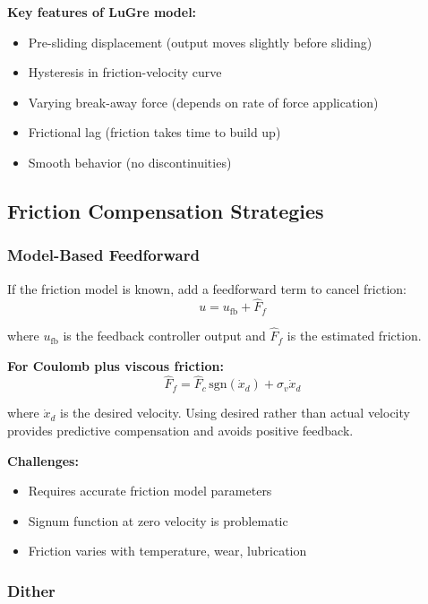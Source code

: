 \textbf{Key features of LuGre model:}
\begin{itemize}
    \item Pre-sliding displacement (output moves slightly before sliding)
    \item Hysteresis in friction-velocity curve
    \item Varying break-away force (depends on rate of force application)
    \item Frictional lag (friction takes time to build up)
    \item Smooth behavior (no discontinuities)
\end{itemize}

\subsection{Friction Compensation Strategies}

\subsubsection{Model-Based Feedforward}

If the friction model is known, add a feedforward term to cancel friction:
\begin{equation}
u = u_{\text{fb}} + \hat{F}_f
\label{eq:friction_feedforward}
\end{equation}

where $u_{\text{fb}}$ is the feedback controller output and $\hat{F}_f$ is the estimated friction.

\textbf{For Coulomb plus viscous friction:}
\begin{equation}
\hat{F}_f = \hat{F}_c \, \text{sgn}(\dot{x}_d) + \hat{\sigma}_v \dot{x}_d
\end{equation}

where $\dot{x}_d$ is the desired velocity. Using desired rather than actual velocity provides predictive compensation and avoids positive feedback.

\textbf{Challenges:}
\begin{itemize}
    \item Requires accurate friction model parameters
    \item Signum function at zero velocity is problematic
    \item Friction varies with temperature, wear, lubrication
\end{itemize}

\subsubsection{Dither}

